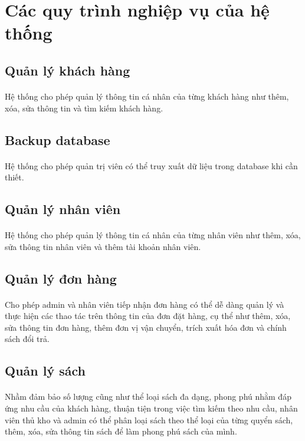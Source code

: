 \documentclass{report}
\begin{document}
\section{Các quy trình nghiệp vụ của hệ thống}
\subsection{Quản lý khách hàng}
\paragraph{}
    Hệ thống cho phép quản lý thông tin cá nhân của từng khách hàng như thêm, xóa, sửa thông tin và tìm kiếm khách hàng.
\subsection{Backup database}
\paragraph{}
    Hệ thống cho phép quản trị viên có thể truy xuất dữ liệu trong database khi cần thiết.
\subsection{Quản lý nhân viên}
\paragraph{}
     Hệ thống cho phép quản lý thông tin cá nhân của từng nhân viên như thêm, xóa, sửa thông tin nhân viên và thêm tài khoản nhân viên.
\subsection{Quản lý đơn hàng}
\paragraph{}
    Cho phép admin và nhân viên tiếp nhận đơn hàng có thể dễ dàng quản lý và thực hiện các thao tác trên thông tin của đơn đặt hàng, cụ thể như thêm, xóa, sửa thông tin đơn hàng, thêm đơn vị vận chuyển, trích xuất hóa đơn và chính sách đổi trả.
\subsection{Quản lý sách}
\paragraph{}
    Nhầm đảm bảo số lượng cũng như thể loại sách đa dạng, phong phú nhằm đáp ứng nhu cầu của khách hàng, thuận tiện trong việc tìm kiếm theo nhu cầu, nhân viên thủ kho và admin có thể phân loại sách theo thể loại của từng quyển sách, thêm, xóa, sửa thông tin sách để làm phong phú sách của mình.
\end{document}

